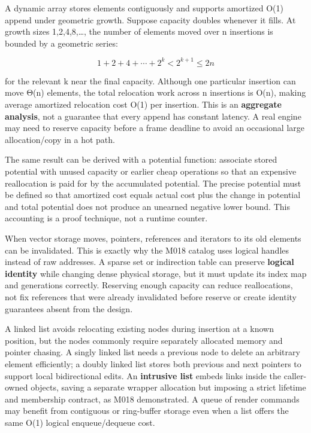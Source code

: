 A dynamic array stores elements contiguously and supports amortized O(1) append under geometric growth. Suppose capacity doubles whenever it fills. At growth sizes 1,2,4,8,\ldots, the number of elements moved over n insertions is bounded by a geometric series:

\[
1+2+4+\cdots+2^k < 2^{k+1}\leq 2n
\]

for the relevant k near the final capacity. Although one particular insertion can move Θ(n) elements, the total relocation work across n insertions is O(n), making average amortized relocation cost O(1) per insertion. This is an \textbf{aggregate analysis}, not a guarantee that every append has constant latency. A real engine may need to reserve capacity before a frame deadline to avoid an occasional large allocation/copy in a hot path.

The same result can be derived with a potential function: associate stored potential with unused capacity or earlier cheap operations so that an expensive reallocation is paid for by the accumulated potential. The precise potential must be defined so that amortized cost equals actual cost plus the change in potential and total potential does not produce an unearned negative lower bound. This accounting is a proof technique, not a runtime counter.

When vector storage moves, pointers, references and iterators to its old elements can be invalidated. This is exactly why the M018 catalog uses logical handles instead of raw addresses. A sparse set or indirection table can preserve \textbf{logical identity} while changing dense physical storage, but it must update its index map and generations correctly. Reserving enough capacity can reduce reallocations, not fix references that were already invalidated before reserve or create identity guarantees absent from the design.

A linked list avoids relocating existing nodes during insertion at a known position, but the nodes commonly require separately allocated memory and pointer chasing. A singly linked list needs a previous node to delete an arbitrary element efficiently; a doubly linked list stores both previous and next pointers to support local bidirectional edits. An \textbf{intrusive list} embeds links inside the caller-owned objects, saving a separate wrapper allocation but imposing a strict lifetime and membership contract, as M018 demonstrated. A queue of render commands may benefit from contiguous or ring-buffer storage even when a list offers the same O(1) logical enqueue/dequeue cost.

